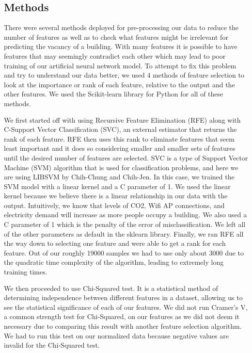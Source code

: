 \documentclass[letterpaper, 12 pt, conference]{ieeeconf}  %
\begin{document}
\subsection{Methods}

There were several methods deployed for pre-processing our data to reduce the number of features as well as to check what features might be irrelevant for predicting the vacancy of a building. With many features it is possible to have features that may seemingly contradict each other which may lead to poor training of our artificial neural network model. To attempt to fix this problem and try to understand our data better, we used 4 methods of feature selection to look at the importance or rank of each feature, relative to the output and the other features. We used the Scikit-learn library for Python for all of these methods.

We first started off with using Recursive Feature Elimination (RFE) along with C-Support Vector Classification (SVC), an external estimator that returns the rank of each feature. RFE then uses this rank to eliminate features that seem least important and it does so considering smaller and smaller sets of features until the desired number of features are selected. SVC is a type of Support Vector Machine (SVM) algorithm that is used for classification problems, and here we are using LIBSVM by Chih-Chung and Chih-Jen. In this case, we trained the SVM model with a linear kernel and a C parameter of 1. We used the linear kernel because we believe there is a linear relationship in our data with the output. Intuitively, we know that levels of CO2, Wifi AP connections, and electricity demand will increase as more people occupy a building. We also used a C parameter of 1 which is the penalty of the error of misclassification. We left all of the other parameters as default in the sklearn library. Finally, we ran RFE all the way down to selecting one feature and were able to get a rank for each feature. Out of our roughly 19000 samples we had to use only about 3000 due to the quadratic time complexity of the algorithm, leading to extremely long training times.
        
We then proceeded to use Chi-Squared test. It is a statistical method of determining independence between different features in a dataset, allowing us to see the statistical significance of each of our features. We did not run Cramer’s V, a common strength test for Chi-Squared, on our features as we did not deem it necessary due to comparing this result with another feature selection algorithm. We had to run this test on our normalized data because negative values are invalid for the Chi-Squared test.
        
\end{document}
